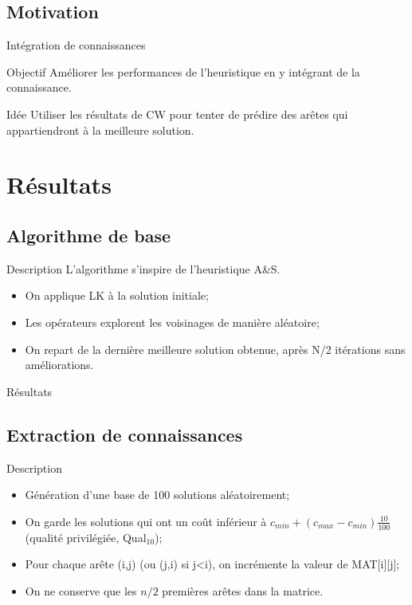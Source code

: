 \documentclass{beamer}
\begin{document}
\subsection{Motivation}

\begin{frame}{Intégration de connaissances}
\begin{block}{Objectif}
Améliorer les performances de l'heuristique en y intégrant de la connaissance.
\end{block}

\begin{exampleblock}{Idée}
Utiliser les résultats de CW pour tenter de prédire des arêtes qui appartiendront à la meilleure solution.
\end{exampleblock}
\end{frame}

\section{Résultats}

\subsection{Algorithme de base}

\begin{frame}{Description}
L'algorithme s'inspire de l'heuristique A\&S. 
\begin{itemize}
\item On applique LK à la solution initiale;
\item Les opérateurs explorent les voisinages de manière aléatoire;
\item On repart de la dernière meilleure solution obtenue, après N/2 itérations sans améliorations.
\end{itemize}
\end{frame}

\begin{frame}{Résultats}

\end{frame}

\subsection{Extraction de connaissances}

\begin{frame}{Description}
\begin{itemize}
\item Génération d'une base de 100 solutions aléatoirement;
\item On garde les solutions qui ont un coût inférieur à $c_{min} + (c_{max}-c_{min})\frac{10}{100}$ (qualité privilégiée, Qual$_{10}$);
\item Pour chaque arête (i,j) (ou (j,i) si j<i), on incrémente la valeur de MAT[i][j];
\item On ne conserve que les $n/2$ premières arêtes dans la matrice.
\end{itemize}
\end{frame}
\end{document}
